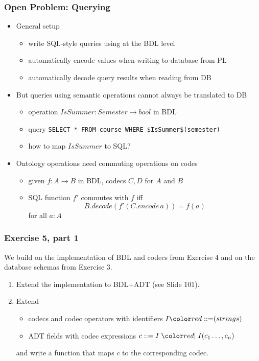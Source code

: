 \begin{frame}\frametitle{Open Problem: Querying}
\begin{itemize}
\item General setup
 \begin{itemize}
 \item write SQL-style queries using at the BDL level
 \item automatically encode values when writing to database from PL
 \item automatically decode query results when reading from DB
 \end{itemize}
\item But queries using semantic operations cannot always be translated to DB
 \begin{itemize}
  \item operation $IsSummer: Semester \to bool$ in BDL
  \item query \lstinline|SELECT * FROM course WHERE $IsSummer$(semester)|
  \item how to map $IsSummer$ to SQL?
 \end{itemize}
\item Ontology operations need commuting operations on codes
\begin{itemize}
\item given $f: A\to B$ in BDL, codecs $C,D$ for $A$ and $B$
\item SQL function $f'$ commutes with $f$ iff \\
  \[B.decode (f'(C.encode\,a)) = f(a)\]
  for all $a:A$
\end{itemize}
\end{itemize}
\end{frame}

\begin{frame}\frametitle{Exercise 5, part 1}
We build on the implementation of BDL and codecs from Exercise 4 and on the database schemas from Exercise 3.

\begin{enumerate}
 \item Extend the implementation to BDL+ADT (see Slide 101).
 \item Extend 
  \begin{itemize}
  \item codecs and codec operators with identifiers $I\bbc (strings)$
  \item ADT fields with codec expressions $c::=I \bnfalt I(c_1\ldots,c_n)$
  \end{itemize}
  and write a function that maps $c$ to the corresponding codec.
\end{enumerate}
\end{frame}

